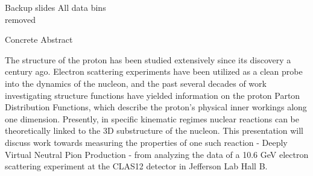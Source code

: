 \documentclass[aspectratio=169]{beamer}
\newcommand*{\myfont}{\fontfamily{lmtt}\selectfont}
\begin{document}
%
%
%



%    







\begin{frame}{Backup slides}
\centering
All data bins\\
removed
\end{frame}



\begin{frame}{Concrete Abstract}

The structure of the proton has been studied extensively since its discovery a century ago.  Electron scattering experiments have been utilized as a clean probe into the dynamics of the nucleon, and the past several decades of work investigating structure functions have yielded information on the proton Parton Distribution Functions, which describe the proton's physical inner workings along one dimension. Presently, in specific kinematic regimes nuclear reactions can be theoretically linked to the 3D substructure of the nucleon. This presentation will discuss work towards measuring the properties of one such reaction - Deeply Virtual Neutral Pion Production - from analyzing the data of a 10.6 GeV electron scattering experiment at the CLAS12 detector in Jefferson Lab Hall B. 

\end{frame}
\end{document}

